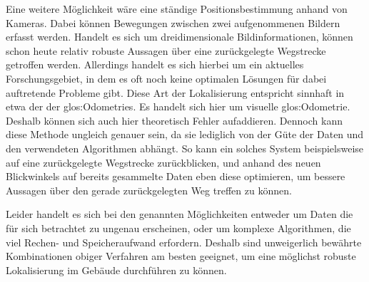 Eine weitere Möglichkeit wäre eine ständige Positionsbestimmung anhand von Kameras. Dabei können Bewegungen zwischen zwei aufgenommenen Bildern erfasst werden. Handelt es sich um dreidimensionale Bildinformationen, können schon heute relativ robuste Aussagen über eine zurückgelegte Wegstrecke getroffen werden. Allerdings handelt es sich hierbei um ein aktuelles Forschungsgebiet, in dem es oft noch keine optimalen Lösungen für dabei auftretende Probleme gibt. Diese Art der Lokalisierung entspricht sinnhaft in etwa der der \glspl{glos:Odometrie}. Es handelt sich hier um visuelle \gls{glos:Odometrie}. Deshalb können sich auch hier theoretisch Fehler aufaddieren. Dennoch kann diese Methode ungleich genauer sein, da sie lediglich von der Güte der Daten und den verwendeten Algorithmen abhängt. So kann ein solches System beispielsweise auf eine zurückgelegte Wegstrecke zurückblicken, und anhand des neuen Blickwinkels auf bereits gesammelte Daten eben diese optimieren, um bessere Aussagen über den gerade zurückgelegten Weg treffen zu können.

Leider handelt es sich bei den genannten Möglichkeiten entweder um Daten die für sich betrachtet zu ungenau erscheinen, oder um komplexe Algorithmen, die viel Rechen- und Speicheraufwand erfordern. Deshalb sind unweigerlich bewährte Kombinationen obiger Verfahren am besten geeignet, um eine möglichst robuste Lokalisierung im Gebäude durchführen zu können.